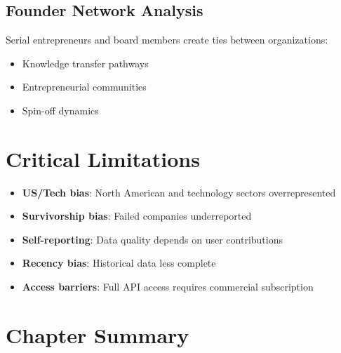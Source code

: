 \subsection*{Founder Network Analysis}

Serial entrepreneurs and board members create ties between organizations:
\begin{itemize}[leftmargin=*, itemsep=0.2em]
\item Knowledge transfer pathways
\item Entrepreneurial communities
\item Spin-off dynamics
\end{itemize}


\section*{Critical Limitations}

\begin{criticalbox}
\begin{itemize}[leftmargin=*, itemsep=0.2em]
\item \textbf{US/Tech bias}: North American and technology sectors overrepresented
\item \textbf{Survivorship bias}: Failed companies underreported
\item \textbf{Self-reporting}: Data quality depends on user contributions
\item \textbf{Recency bias}: Historical data less complete
\item \textbf{Access barriers}: Full API access requires commercial subscription
\end{itemize}
\end{criticalbox}


\section*{Chapter Summary}


